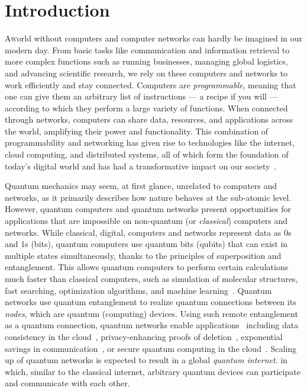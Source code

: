 \chapter{Introduction}
\label{chp:intro}

\lettrine{A} world without computers and computer networks can hardly be imagined in our modern day.
From basic tasks like communication and information retrieval to more complex functions such as running businesses, managing global logistics, and advancing scientific research, we rely on these computers and networks to work efficiently and stay connected.
Computers are \emph{programmable}, meaning that one can give them an arbitrary list of instructions --- a recipe if you will --- according to which they perform a large variety of functions.
When connected through networks, computers can share data, resources, and applications across the world, amplifying their power and functionality.
This combination of programmability and networking has given rise to technologies like the internet, cloud computing, and distributed systems, all of which form the foundation of today's digital world and has had a transformative impact on our society~\cite{castells_impact_2013}.

Quantum mechanics may seem, at first glance, unrelated to computers and networks, as it primarily describes how nature behaves at the sub-atomic level.
However, quantum computers and quantum networks present opportunities for applications that are impossible on non-quantum (or \emph{classical}) computers and networks.
While classical, digital, computers and networks represent data as 0s and 1s (bits), quantum computers use quantum bits (qubits) that can exist in multiple states simultaneously, thanks to the principles of superposition and entanglement.
This allows quantum computers to perform certain calculations much faster than classical computers, such as simulation of molecular structures, fast searching, optimization algorithms, and machine learning~\cite{montanaro_quantum_2016, dalzell_quantum_2023}.
Quantum networks use quantum entanglement to realize quantum connections between its \emph{nodes}, which are quantum (computing) devices.
Using such remote entanglement as a quantum connection, quantum networks enable applications~\cite{wehner_2018_stages} including data consistency in the cloud~\cite{benor_2005_byzantine}, privacy-enhancing proofs of deletion~\cite{poremba_quantum_2022}, exponential savings in communication~\cite{guerin_exponential_2016}, or secure quantum computing in the cloud~\cite{broadbent_2009_ubqc,childs_2005_secure_qc}.
Scaling up of quantum networks is expected to result in a global \textit{quantum internet}.
in which, similar to the classical internet, arbitrary quantum devices can participate and communicate with each other.


